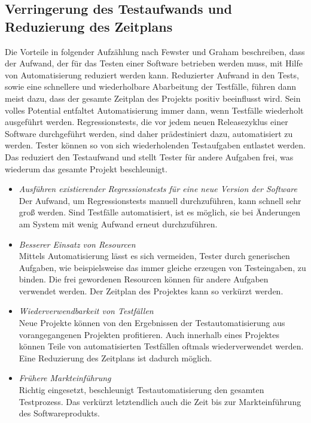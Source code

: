 \subsection{Verringerung des Testaufwands und Reduzierung des Zeitplans}
\label{sec:verringerung_des_testaufwands_und_reduzierung_des_zeitplans}
Die Vorteile in folgender Aufzählung nach Fewster und Graham \cite[vgl. S. 9 ff.]{fewster_software_1999} beschreiben, dass der Aufwand, der für das Testen einer Software betrieben werden muss, mit Hilfe von Automatisierung reduziert werden kann.
Reduzierter Aufwand in den Tests, sowie eine schnellere und wiederholbare Abarbeitung der Testfälle, führen dann meist dazu, dass der gesamte Zeitplan des Projekts positiv beeinflusst wird. Sein volles Potential entfaltet Automatisierung immer dann, wenn Testfälle wiederholt ausgeführt werden. Regressionstests, die vor jedem neuen Releasezyklus einer Software durchgeführt werden, sind daher prädestiniert dazu, automatisiert zu werden. Tester können so von sich wiederholenden Testaufgaben entlastet werden. Das reduziert den Testaufwand und stellt Tester für andere Aufgaben frei, was wiederum das gesamte Projekt beschleunigt.

\begin{itemize}
\item \textit{Ausführen existierender Regressionstests für eine neue Version der Software} \\
Der Aufwand, um Regressionstests manuell durchzuführen, kann schnell sehr groß werden. Sind Testfälle automatisiert, ist es möglich, sie bei Änderungen am System mit wenig Aufwand erneut durchzuführen.
\item \textit{Besserer Einsatz von Resourcen} \\
Mittels Automatisierung lässt es sich vermeiden, Tester durch generischen Aufgaben, wie beispielsweise das immer gleiche erzeugen von Testeingaben, zu binden.
Die frei gewordenen Resourcen können für andere Aufgaben verwendet werden.
Der Zeitplan des Projektes kann so verkürzt werden. 
\item \textit{Wiederverwendbarkeit von Testfällen} \\
Neue Projekte können von den Ergebnissen der Testautomatisierung aus vorangegangenen Projekten profitieren. Auch innerhalb eines Projektes können Teile von automatisierten Testfällen oftmals wiederverwendet werden.
Eine Reduzierung des Zeitplans ist dadurch möglich.
\item \textit{Frühere Markteinführung} \\
Richtig eingesetzt, beschleunigt Testautomatisierung den gesamten Testprozess. Das verkürzt letztendlich auch die Zeit bis zur Markteinführung des Softwareprodukts. 
\end{itemize}


